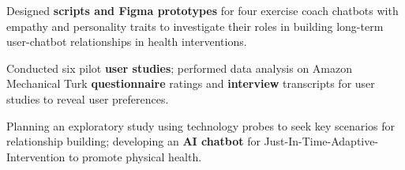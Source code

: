 \vspace{-0.5mm}
      \resumeItemListStart


        \item Designed \textbf{scripts and Figma prototypes} for four exercise coach chatbots with empathy and personality traits to investigate their roles in building long-term user-chatbot relationships in health interventions.
        \item Conducted six pilot \textbf{user studies}; performed data analysis on Amazon Mechanical Turk \textbf{questionnaire} ratings and \textbf{interview} transcripts for user studies to reveal user preferences.
      \item Planning an exploratory study using technology probes to seek key scenarios for relationship building; developing an \textbf{AI chatbot} for Just-In-Time-Adaptive-Intervention to promote physical health.
      \resumeItemListEnd



